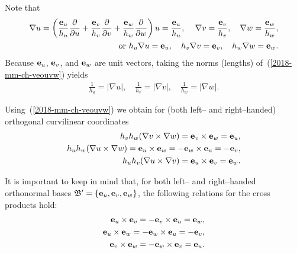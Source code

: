 Note that \cite{chow_2000}
\begin{equation}
\begin{split}
 \nabla  u =
\left(\frac{{\bf e}_u}{h_u}  \frac{\partial  }{\partial u}    +
\frac{{\bf e}_v}{h_v}  \frac{\partial  }{\partial v}      +
\frac{{\bf e}_w}{h_w} \frac{\partial  }{\partial w}\right) u =
 \frac{{\bf e}_u}{h_u} \text{, }\quad
 \nabla  v =  \frac{{\bf e}_v}{h_v}  ,\quad
 \nabla  w =  \frac{{\bf e}_w}{h_w}  \text{,}  \\
 \text{or } h_u \nabla  u =  {\bf e}_u,\quad
h_v \nabla  v =  {\bf e}_v ,\quad
h_w \nabla  w =  {\bf e}_w
.
\end{split}
\label{2018-mm-ch-veouvw}
\end{equation}
Because
${\bf e}_u$, ${\bf e}_v$, and ${\bf e}_w$ are unit vectors, taking the norms (lengths)
of~(\ref{2018-mm-ch-veouvw}) yields
\begin{equation}
\begin{split}
\frac{1}{h_u}  = | \nabla  u | ,\quad
\frac{1}{h_v}  = | \nabla  v | ,\quad
\frac{1}{h_w}  = | \nabla  w |
.
\end{split}
\label{2018-mm-ch-veouvwtn}
\end{equation}

Using~(\ref{2018-mm-ch-veouvw}) we obtain for
(both left-- and right--handed)
orthogonal curvilinear coordinates
\begin{equation}
\begin{split}
 h_v h_w ( \nabla  v \times \nabla  w ) =
{\bf e}_v \times {\bf e}_w  = {\bf e}_u ,\\
 h_u h_w ( \nabla  u \times \nabla  w ) =
{\bf e}_u \times {\bf e}_w  =
- {\bf e}_w \times {\bf e}_u  =
- {\bf e}_v ,                                 \\
 h_u h_v ( \nabla  u \times \nabla  v ) =
{\bf e}_u \times {\bf e}_v  =
{\bf e}_w
.
\end{split}
\label{2018-mm-ch-veouvwtnex}
\end{equation}


It is important to keep in mind that,
for both left-- and right--handed orthonormal bases
${\frak B}'=\{
{\bf e}_u,
{\bf e}_v,
{\bf e}_w
\}$, the following  relations for the cross products hold:
\begin{equation}
\begin{split}
{\bf e}_u \times {\bf e}_v  =
- {\bf e}_v \times {\bf e}_u
= {\bf e}_w
,\\
{\bf e}_u \times {\bf e}_w   =
- {\bf e}_w \times {\bf e}_u
= - {\bf e}_v
, \\
{\bf e}_v \times {\bf e}_w    =
- {\bf e}_w \times {\bf e}_v
= {\bf e}_u
.
\end{split}
\end{equation}


